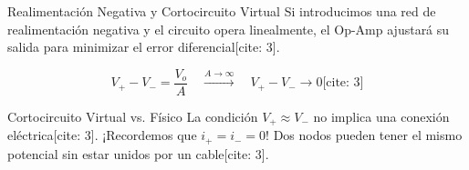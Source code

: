 \documentclass[aspectratio=169, table, xcdraw]{beamer}
\begin{document}
\begin{frame}{Realimentación Negativa y Cortocircuito Virtual}
    Si introducimos una red de realimentación negativa y el circuito opera linealmente, el Op-Amp ajustará su salida para minimizar el error diferencial[cite: 3].
    
    \begin{equation*}
        V_+ - V_- = \frac{V_o}{A} \quad \xrightarrow{A \to \infty} \quad V_+ - V_- \rightarrow 0 \text{[cite: 3]}
    \end{equation*}

    \begin{alertblock}{Cortocircuito Virtual vs. Físico}
        La condición $\boxed{V_+ \approx V_-}$ no implica una conexión eléctrica[cite: 3]. ¡Recordemos que $i_+ = i_- = 0$! Dos nodos pueden tener el mismo potencial sin estar unidos por un cable[cite: 3].
    \end{alertblock}
\end{frame}
\end{document}
